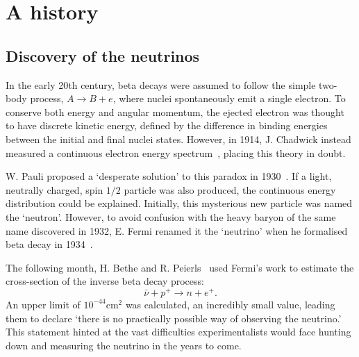 \section{A history}
\label{sec:theory_history}

\subsection{Discovery of the neutrinos} %
\label{sec:theory_history_neutrinos}

In the early 20th century, beta decays were assumed to follow the simple two-body process, $A
    \rightarrow B + e$, where nuclei spontaneously emit a single electron. To conserve both energy
and angular momentum, the ejected electron was thought to have discrete kinetic energy,
defined by the difference in binding energies between the initial and final nuclei states.
However, in 1914, J. Chadwick instead measured a continuous electron energy
spectrum~\cite{chadwick1914}, placing this theory in doubt.

W. Pauli proposed a `desperate solution' to this paradox in 1930~\cite{pauli1930}. If a light,
neutrally charged, spin $1/2$ particle was also produced, the continuous energy distribution could
be explained. Initially, this mysterious new particle was named the `neutron'. However, to avoid
confusion with the heavy baryon of the same name discovered in 1932, E. Fermi renamed it the
`neutrino' when he formalised beta decay in 1934~\cite{fermi1934}.

The following month, H. Bethe and R. Peierls~\cite{bethe1934} used Fermi's work to estimate the
cross-section of the inverse beta decay process:
\begin{equation} %
    \bar{\nu} + p^{+} \rightarrow n + e^{+}.
    \label{eq:inverse_beta_decay}
\end{equation} %
An upper limit of $10^{-44} \mathrm{cm}^2$ was calculated, an incredibly small value, leading them to
declare `there is no practically possible way of observing the neutrino.' This statement hinted at
the vast difficulties experimentalists would face hunting down and measuring the neutrino in the
years to come.

